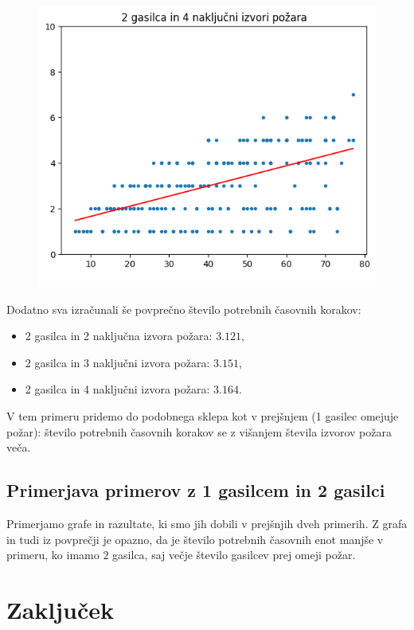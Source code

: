 \documentclass[a4paper, 12pt]{article}
\begin{document}
\begin{figure}[!htb]
      \includegraphics[width=\linewidth]{plot24}
    \endminipage
\end{figure}

\pagebreak

\noindent Dodatno sva izračunali še povprečno število potrebnih časovnih korakov:
\begin{itemize}
    \item 2 gasilca in 2 naključna izvora požara: $3.121$,
    \item 2 gasilca in 3 naključni izvora požara: $3.151$,
    \item 2 gasilca in 4 naključni izvora požara: $3.164$.
\end{itemize}

\noindent V tem primeru pridemo do podobnega sklepa kot v prejšnjem (1 gasilec omejuje požar):
število potrebnih časovnih korakov se z višanjem števila izvorov požara veča. 

\subsection{Primerjava primerov z 1 gasilcem in 2 gasilci}
Primerjamo grafe in razultate, ki smo jih dobili v prejšnjih dveh primerih.
Z grafa in tudi iz povprečji je opazno, da je število potrebnih časovnih enot manjše v primeru, ko
imamo $2$ gasilca, saj večje število gasilcev prej omeji požar. 

\pagebreak
\section{Zaključek}
\end{document}
